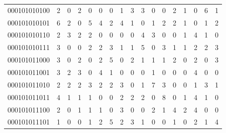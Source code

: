 \documentclass[10pt,a4paper]{article}
\begin{document}
\begin{longtable}{ |c|c|c|c|c|c|c|c|c|c|c|c|c|c|c|c|c| }
    000101010100              & 2                            & 0                                & 2                            & 0                              & 0   & 0   & 1   & 3   & 3   & 0   & 0   & 2   & 1   & 0   & 6   & 1   \\
    000101010101              & 6                            & 2                                & 0                            & 5                              & 4   & 2   & 4   & 1   & 0   & 1   & 2   & 2   & 1   & 0   & 1   & 2   \\
    000101010110              & 2                            & 3                                & 2                            & 2                              & 0   & 0   & 0   & 0   & 4   & 3   & 0   & 0   & 1   & 4   & 1   & 0   \\
    000101010111              & 3                            & 0                                & 0                            & 2                              & 2   & 3   & 1   & 1   & 5   & 0   & 3   & 1   & 1   & 2   & 2   & 3   \\
    000101011000              & 3                            & 0                                & 2                            & 0                              & 2   & 5   & 0   & 2   & 1   & 1   & 1   & 2   & 0   & 2   & 0   & 3   \\
    000101011001              & 3                            & 2                                & 3                            & 0                              & 4   & 1   & 0   & 0   & 0   & 1   & 0   & 0   & 0   & 4   & 0   & 0   \\
    000101011010              & 2                            & 2                                & 2                            & 3                              & 2   & 2   & 3   & 0   & 1   & 7   & 3   & 0   & 0   & 1   & 3   & 1   \\
    000101011011              & 4                            & 1                                & 1                            & 1                              & 0   & 0   & 2   & 2   & 2   & 0   & 8   & 0   & 1   & 4   & 1   & 0   \\
    000101011100              & 2                            & 0                                & 1                            & 1                              & 1   & 0   & 3   & 0   & 0   & 2   & 1   & 4   & 2   & 4   & 0   & 0   \\
    000101011101              & 1                            & 0                                & 0                            & 1                              & 2   & 5   & 2   & 3   & 1   & 0   & 0   & 1   & 0   & 2   & 1   & 4   \\

\end{longtable}
\end{document}
